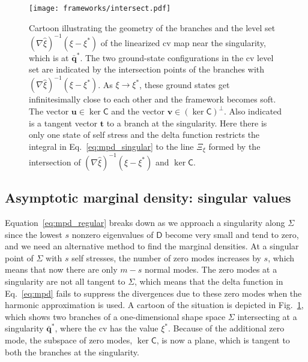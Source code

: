 \begin{figure}
  \begin{center}
    \texttt{[image: frameworks/intersect.pdf]}
  \end{center}
  \caption{Cartoon illustrating the geometry of the branches and the level set $(\nabla\hat{\xi})^{-1}(\xi - \xi^{*})$ of the linearized \ac{cv} map near the singularity, which is at $\bar{\bm{q}}^{*}$.
    The two ground-state configurations in the \ac{cv} level set are indicated by the intersection points of the branches with $(\nabla\hat{\xi})^{-1}(\xi - \xi^{*})$.  As $\xi \to \xi^{*}$, these ground states get infinitesimally close to each other and the framework becomes soft.
    The vector $\bm{u} \in \ker\mathsf{C}$ and the vector $\bm{v} \in (\ker\mathsf{C})^{\perp}$.
    Also indicated is a tangent vector $\bm{t}$ to a branch at the singularity.
    Here there is only one state of self stress and the delta function restricts the integral in Eq.~\eqref{eq:mpd_singular} to the line $\Xi_{\xi}$ formed by the intersection of $(\nabla\hat{\xi})^{-1}(\xi - \xi^{*})$ and $\ker\mathsf{C}$.
  }
  \label{fig:intersect}
\end{figure}

\subsection{Asymptotic marginal density: singular values}
\label{sec:singular}

Equation~\eqref{eq:mpd_regular} breaks down as we approach a singularity along $\Sigma$ since the lowest $s$ nonzero eigenvalues of $\mathsf{D}$ become very small and tend to zero, and we need an alternative method to find the marginal densities.
At a singular point of $\Sigma$ with $s$ self stresses, the number of zero modes increases by $s$, which means that now there are only $m-s$ normal modes.
The zero modes at a singularity are not all tangent to $\Sigma$, which means that the delta function in Eq.~\eqref{eq:mpd} fails to suppress the divergences due to these zero modes when the harmonic approximation is used.
A cartoon of the situation is depicted in Fig.~\ref{fig:intersect}, which shows two branches of a one-dimensional shape space $\Sigma$ intersecting at a singularity $\bar{\bm{q}}^{*}$, where the \ac{cv} has the value $\xi^{*}$.
Because of the additional zero mode, the subspace of zero modes, $\ker\mathsf{C}$, is now a plane, which is tangent to both the branches at the singularity.

